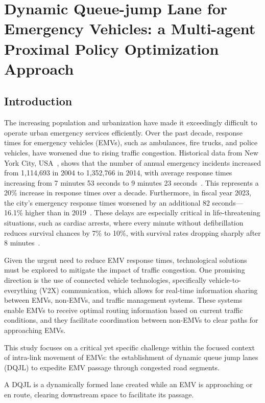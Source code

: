 \chapter{Dynamic Queue-jump Lane for Emergency Vehicles: a Multi-agent Proximal Policy Optimization Approach}\label{chap:mappo-dqjl}
\section{Introduction}
\label{sec:introduction}
The increasing population and urbanization have made it exceedingly difficult to operate urban emergency services efficiently. Over the past decade, response times for emergency vehicles (EMVs), such as ambulances, fire trucks, and police vehicles, have worsened due to rising traffic congestion. Historical data from New York City, USA~\cite{NY2019}, shows that the number of annual emergency incidents increased from 1,114,693 in 2004 to 1,352,766 in 2014, with average response times increasing from 7 minutes 53 seconds to 9 minutes 23 seconds~\cite{Emergency2014}. This represents a 20\% increase in response times over a decade. Furthermore, in fiscal year 2023, the city's emergency response times worsened by an additional 82 seconds—16.1\% higher than in 2019~\cite{Calder_2023}. These delays are especially critical in life-threatening situations, such as cardiac arrests, where every minute without defibrillation reduces survival chances by 7\% to 10\%, with survival rates dropping sharply after 8 minutes~\cite{Heart2013}.

Given the urgent need to reduce EMV response times, technological solutions must be explored to mitigate the impact of traffic congestion. One promising direction is the use of connected vehicle technologies, specifically vehicle-to-everything (V2X) communication, which allows for real-time information sharing between EMVs, non-EMVs, and traffic management systems. These systems enable EMVs to receive optimal routing information based on current traffic conditions, and they facilitate coordination between non-EMVs to clear paths for approaching EMVs.

This study focuses on a critical yet specific challenge within the focused context of intra-link movement of EMVs: the establishment of dynamic queue jump lanes (DQJL) to expedite EMV passage through congested road segments.

\begin{definition}\label{def:dqjl}
A DQJL is a dynamically formed lane created while an EMV is approaching or en route, clearing downstream space to facilitate its passage. 
\end{definition}

